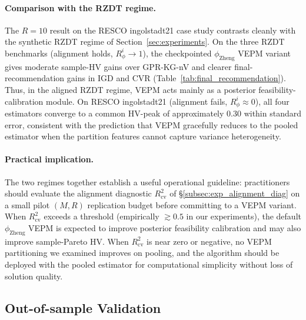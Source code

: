 \documentclass[12pt]{article}
\theoremstyle{plain}
\theoremstyle{definition}
\theoremstyle{remark}
\begin{document}
\paragraph{Comparison with the RZDT regime.}
The $R=10$ result on the RESCO ingolstadt21 case study contrasts
cleanly with the synthetic RZDT regime of
Section~\ref{sec:experiments}.  On the three RZDT benchmarks
(alignment holds, $R_\phi^i \to 1$), the checkpointed
$\phi_{\mathrm{Zheng}}$ VEPM variant gives moderate sample-HV gains
over GPR-KG-nV and clearer final-recommendation gains in IGD and CVR
(Table~\ref{tab:final_recommendation}).  Thus, in the aligned RZDT
regime, VEPM acts mainly as a posterior feasibility-calibration module.
On RESCO ingolstadt21 (alignment fails, $R_\phi^i \approx 0$), all four
estimators converge to a common HV-peak of approximately $0.30$ within
standard error, consistent with the prediction that VEPM gracefully
reduces to the pooled estimator when the partition features cannot
capture variance heterogeneity.

\paragraph{Practical implication.}
The two regimes together establish a useful operational guideline:
practitioners should evaluate the alignment diagnostic
$R^{2}_{\mathrm{cv}}$ of \S\ref{subsec:exp_alignment_diag} on a
small pilot $(M, R)$ replication budget before committing to a VEPM
variant.  When $R^{2}_{\mathrm{cv}}$ exceeds a threshold (empirically
$\gtrsim 0.5$ in our experiments), the default $\phi_{\mathrm{Zheng}}$
VEPM is expected to improve posterior feasibility calibration and may
also improve sample-Pareto HV.  When $R^{2}_{\mathrm{cv}}$ is near zero
or negative, no VEPM partitioning we examined improves on pooling, and
the algorithm should be deployed with the pooled estimator for
computational simplicity without loss of solution quality.


\subsection{Out-of-sample Validation}\label{subsec:case_complexity}
\end{document}
